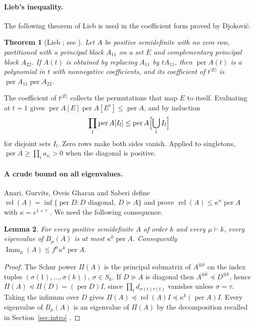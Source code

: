 \documentclass[11pt,a4paper]{article}
\newtheorem{theorem}{Theorem}[section]
\newtheorem{lemma}[theorem]{Lemma}
\theoremstyle{remark}
\newcommand{\per}{\operatorname{per}}
\newcommand{\Imm}{\operatorname{Imm}}
\begin{document}
\paragraph{Lieb's inequality.} The following theorem of Lieb is used in the coefficient form proved by Djokovi\'c.
\begin{theorem}[Lieb \cite{Lieb}; see \cite{Djokovic}]\label{thm:lieb}
Let $A$ be positive semidefinite with no zero row, partitioned with a principal block $A_{11}$ on a set $E$ and complementary principal block $A_{22}$. If $A(t)$ is obtained by replacing $A_{11}$ by $tA_{11}$, then $\per A(t)$ is a polynomial in $t$ with nonnegative coefficients, and its coefficient of $t^{|E|}$ is $\per A_{11}\per A_{22}$.
\end{theorem}
The coefficient of $t^{|E|}$ collects the permutations that map $E$ to itself. Evaluating at $t=1$ gives $\per A[E]\per A[E^c]\le\per A$, and by induction
\begin{equation}\label{eq:liebmulti}
 \prod_{l}\per A[I_l]\le\per A\Bigl[\bigcup_lI_l\Bigr]
\end{equation}
for disjoint sets $I_l$. Zero rows make both sides vanish. Applied to singletons, $\per A\ge\prod_ia_{ii}>0$ when the diagonal is positive.

\paragraph{A crude bound on all eigenvalues.} Anari, Gurvits, Oveis Gharan and Saberi define $\operatorname{rel}(A)=\inf\{\per D:D\text{ diagonal},\ D\succeq A\}$ and prove $\operatorname{rel}(A)\le\kappa^n\per A$ with $\kappa=e^{1+\gamma}$ \cite[Theorem~1 and eq.~(2)]{AGOS}. We need the following consequence.
\begin{lemma}\label{lem:agos}
For every positive semidefinite $A$ of order $k$ and every $\mu\vdash k$, every eigenvalue of $B_\mu(A)$ is at most $\kappa^k\per A$. Consequently $\Imm_\mu(A)\le f^\mu\kappa^k\per A$.
\end{lemma}
\begin{proof}
The Schur power $\Pi(A)$ is the principal submatrix of $A^{\otimes k}$ on the index tuples $(\sigma(1),\dots,\sigma(k))$, $\sigma\in S_k$. If $D\succeq A$ is diagonal then $A^{\otimes k}\preceq D^{\otimes k}$, hence $\Pi(A)\preceq\Pi(D)=(\per D)I$, since $\prod_td_{\sigma(t)\tau(t)}$ vanishes unless $\sigma=\tau$. Taking the infimum over $D$ gives $\Pi(A)\preceq\operatorname{rel}(A)I\preceq\kappa^k(\per A)I$. Every eigenvalue of $B_\mu(A)$ is an eigenvalue of $\Pi(A)$ by the decomposition recalled in Section~\ref{sec:intro} \cite[Lemma~2.2]{Lavi}.
\end{proof}
\end{document}
